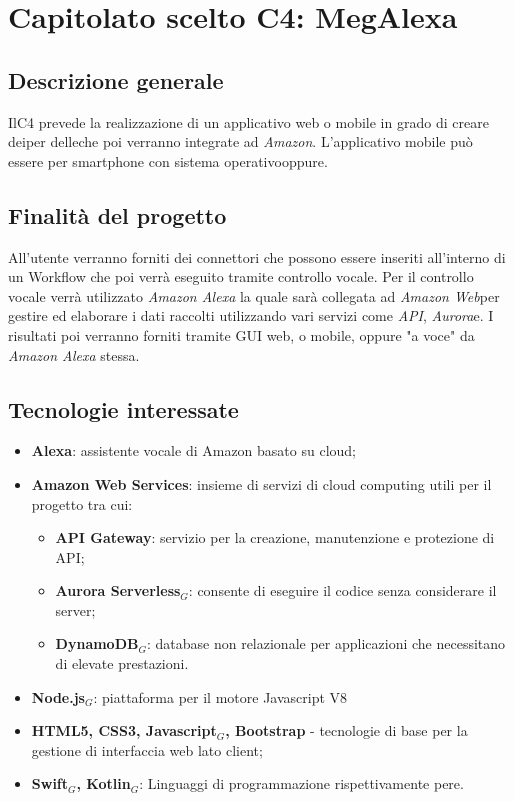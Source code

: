 \chapter{Capitolato scelto C4: MegAlexa}
\section{Descrizione generale}
IlC4 prevede la realizzazione di un applicativo web o mobile in grado di creare deiper delleche poi verranno integrate ad \textit{Amazon}.
L'applicativo mobile può essere per smartphone con sistema operativooppure.
\section{Finalit\`a del progetto}
All'utente verranno forniti dei connettori che possono essere inseriti all'interno di un Workflow che poi verrà eseguito tramite controllo vocale.  
Per il controllo vocale verrà utilizzato \emph{Amazon Alexa} la quale sarà collegata ad \textit{Amazon Web}per gestire ed elaborare i dati raccolti utilizzando vari servizi come \textit{API}, \textit{Aurora}e.
I risultati poi verranno forniti tramite GUI web, o mobile, oppure "a voce" da \emph{Amazon Alexa} stessa.
\section{Tecnologie interessate}
\begin{itemize}
	\item \textbf{Alexa}: assistente vocale di Amazon basato su cloud;
	\item \textbf{Amazon Web Services}: insieme di servizi di cloud computing utili per il progetto tra cui:
	\begin{itemize}
	\item \textbf{API Gateway}: servizio per la creazione, manutenzione e protezione di API;
	\item \textbf{Aurora Serverless$_{G}$}: consente di eseguire il codice senza considerare il server;
	\item \textbf{DynamoDB$_{G}$}: database non relazionale per applicazioni che necessitano di elevate prestazioni.
	\end{itemize}
	\item \textbf{Node.js$_{G}$}: piattaforma per il motore Javascript V8
	\item \textbf{HTML5, CSS3, Javascript$_{G}$, Bootstrap} - tecnologie di base per la gestione di interfaccia web lato client;
	\item \textbf{Swift$_{G}$, Kotlin$_{G}$}: Linguaggi di programmazione rispettivamente pere.
\end{itemize}
